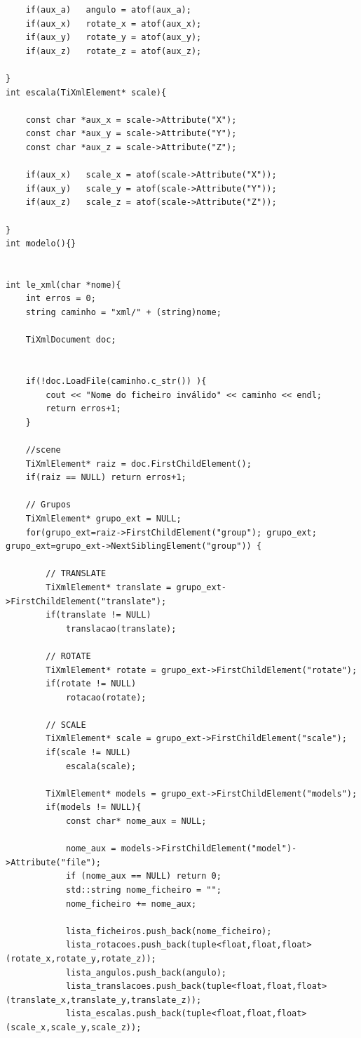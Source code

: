 \documentclass{report}
\begin{document}
\begin{lstlisting}
    if(aux_a)   angulo = atof(aux_a);
    if(aux_x)   rotate_x = atof(aux_x);
    if(aux_y)   rotate_y = atof(aux_y);
    if(aux_z)   rotate_z = atof(aux_z);

}
int escala(TiXmlElement* scale){

    const char *aux_x = scale->Attribute("X");
    const char *aux_y = scale->Attribute("Y");
    const char *aux_z = scale->Attribute("Z");

    if(aux_x)   scale_x = atof(scale->Attribute("X"));
    if(aux_y)   scale_y = atof(scale->Attribute("Y"));
    if(aux_z)   scale_z = atof(scale->Attribute("Z"));

}
int modelo(){}


int le_xml(char *nome){
    int erros = 0;
    string caminho = "xml/" + (string)nome;

    TiXmlDocument doc;


    if(!doc.LoadFile(caminho.c_str()) ){
        cout << "Nome do ficheiro inválido" << caminho << endl;
        return erros+1;
    }

    //scene
    TiXmlElement* raiz = doc.FirstChildElement();
    if(raiz == NULL) return erros+1;

    // Grupos
    TiXmlElement* grupo_ext = NULL;
    for(grupo_ext=raiz->FirstChildElement("group"); grupo_ext; grupo_ext=grupo_ext->NextSiblingElement("group")) {

        // TRANSLATE
        TiXmlElement* translate = grupo_ext->FirstChildElement("translate");
        if(translate != NULL)
            translacao(translate);

        // ROTATE
        TiXmlElement* rotate = grupo_ext->FirstChildElement("rotate");
        if(rotate != NULL)
            rotacao(rotate);

        // SCALE
        TiXmlElement* scale = grupo_ext->FirstChildElement("scale");
        if(scale != NULL)
            escala(scale);

        TiXmlElement* models = grupo_ext->FirstChildElement("models");
        if(models != NULL){
            const char* nome_aux = NULL;

            nome_aux = models->FirstChildElement("model")->Attribute("file");
            if (nome_aux == NULL) return 0;
            std::string nome_ficheiro = "";
            nome_ficheiro += nome_aux;

            lista_ficheiros.push_back(nome_ficheiro);
            lista_rotacoes.push_back(tuple<float,float,float>(rotate_x,rotate_y,rotate_z));
            lista_angulos.push_back(angulo);
            lista_translacoes.push_back(tuple<float,float,float>(translate_x,translate_y,translate_z));
            lista_escalas.push_back(tuple<float,float,float>(scale_x,scale_y,scale_z));


\end{lstlisting}
\end{document}
